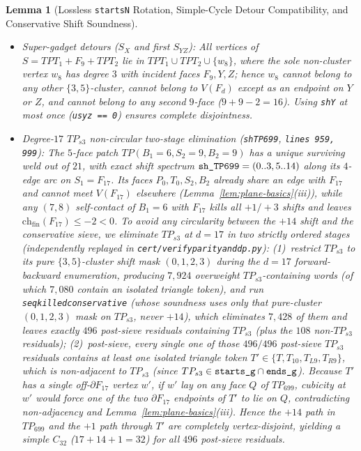 \documentclass[11pt,reqno]{amsart}
\theoremstyle{plain}
\newtheorem{lemma}[theorem]{Lemma}
\theoremstyle{definition}
\theoremstyle{remark}
\newcommand{\chf}{\mathrm{ch}_{\mathrm{fin}}}
\DeclareRobustCommand{\_}{\ifmmode\text{\textunderscore}\else\textunderscore\allowbreak\fi}
\begin{document}
\begin{lemma}[Lossless \texttt{starts\_N} Rotation, Simple-Cycle Detour Compatibility, and Conservative Shift Soundness]
\begin{enumerate}[label=(\roman*),leftmargin=2.2em]
\begin{itemize}[leftmargin=1.5em]
    \item \emph{Super-gadget detours ($S_X$ and first $S_{YZ}$):} All vertices of $S = TPT_1 + F_9 + TPT_2$ lie in $TPT_1 \cup TPT_2 \cup \{w_8\}$, where the sole non-cluster vertex $w_8$ has degree $3$ with incident faces $F_9, Y, Z$; hence $w_8$ cannot belong to any other $\{3,5\}$-cluster, cannot belong to $V(F_d)$ except as an endpoint on $Y$ or $Z$, and cannot belong to any second $9$-face ($9+9-2=16$). Using \texttt{sh\_Y} at most once (\texttt{usyz == 0}) ensures complete disjointness.
    \item \emph{Degree-$17$ $TP_{s3}$ non-circular two-stage elimination (\texttt{sh\_TP699}, \texttt{lines 959, 999}):} The $5$-face patch $TP(B_1=6, S_2=9, B_2=9)$ has a unique surviving weld out of $21$, with exact shift spectrum $\texttt{sh\_TP699} = (0..3, 5..14)$ along its $4$-edge arc on $S_1 = F_{17}$. Its faces $P_0, T_0, S_2, B_2$ already share an edge with $F_{17}$ and cannot meet $V(F_{17})$ elsewhere (Lemma~\ref{lem:plane-basics}(iii)), while any $(7, 8)$ self-contact of $B_1 = 6$ with $F_{17}$ kills all $+1/+3$ shifts and leaves $\chf(F_{17}) \le -2 < 0$. To avoid any circularity between the $+14$ shift and the conservative sieve, we eliminate $TP_{s3}$ at $d = 17$ in two strictly ordered stages (independently replayed in \texttt{cert/verify\_parity\_and\_dp.py}): (1)~restrict $TP_{s3}$ to its pure $\{3,5\}$-cluster shift mask $(0, 1, 2, 3)$ during the $d = 17$ forward-backward enumeration, producing $7{,}924$ overweight $TP_{s3}$-containing words (of which $7{,}080$ contain an isolated triangle token), and run \texttt{seq\_killed\_conservative} (whose soundness uses \emph{only} that pure-cluster $(0, 1, 2, 3)$ mask on $TP_{s3}$, never $+14$), which eliminates $7{,}428$ of them and leaves exactly $496$ post-sieve residuals containing $TP_{s3}$ (plus the $108$ non-$TP_{s3}$ residuals); (2)~post-sieve, every single one of those $496/496$ post-sieve $TP_{s3}$ residuals contains at least one isolated triangle token $T' \in \{T, T_{10}, T_{L9}, T_{R9}\}$, which is non-adjacent to $TP_{s3}$ (since $TP_{s3} \in \texttt{starts\_g} \cap \texttt{ends\_g}$). Because $T'$ has a single off-$\partial F_{17}$ vertex $w'$, if $w'$ lay on any face $Q$ of $TP_{699}$, cubicity at $w'$ would force one of the two $\partial F_{17}$ endpoints of $T'$ to lie on $Q$, contradicting non-adjacency and Lemma~\ref{lem:plane-basics}(iii). Hence the $+14$ path in $TP_{699}$ and the $+1$ path through $T'$ are completely vertex-disjoint, yielding a simple $C_{32}$ ($17 + 14 + 1 = 32$) for all $496$ post-sieve residuals.

\end{itemize}
\end{enumerate}
\end{lemma}
\end{document}

